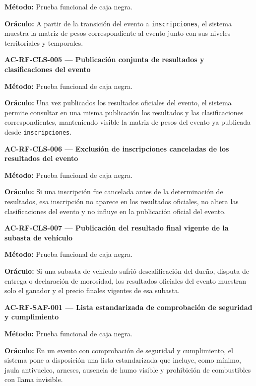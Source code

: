 \documentclass[10pt,letterpaper]{article}
\begin{document}
\textbf{Método:} Prueba funcional de caja negra.\par
\textbf{Oráculo:} A partir de la transición del evento a \texttt{inscripciones}, el sistema muestra la matriz de pesos correspondiente al evento junto con sus niveles territoriales y temporales.\par\vspace{0.45em}
\noindent\textbf{AC-RF-CLS-005 --- Publicación conjunta de resultados y clasificaciones del evento}\par
\textbf{Método:} Prueba funcional de caja negra.\par
\textbf{Oráculo:} Una vez publicados los resultados oficiales del evento, el sistema permite consultar en una misma publicación los resultados y las clasificaciones correspondientes, manteniendo visible la matriz de pesos del evento ya publicada desde \texttt{inscripciones}.\par\vspace{0.45em}
\noindent\textbf{AC-RF-CLS-006 --- Exclusión de inscripciones canceladas de los resultados del evento}\par
\textbf{Método:} Prueba funcional de caja negra.\par
\textbf{Oráculo:} Si una inscripción fue cancelada antes de la determinación de resultados, esa inscripción no aparece en los resultados oficiales, no altera las clasificaciones del evento y no influye en la publicación oficial del evento.\par\vspace{0.45em}
\noindent\textbf{AC-RF-CLS-007 --- Publicación del resultado final vigente de la subasta de vehículo}\par
\textbf{Método:} Prueba funcional de caja negra.\par
\textbf{Oráculo:} Si una subasta de vehículo sufrió descalificación del dueño, disputa de entrega o declaración de morosidad, los resultados oficiales del evento muestran solo el ganador y el precio finales vigentes de esa subasta.\par\vspace{0.45em}
\noindent\textbf{AC-RF-SAF-001 --- Lista estandarizada de comprobación de seguridad y cumplimiento}\par
\textbf{Método:} Prueba funcional de caja negra.\par
\textbf{Oráculo:} En un evento con comprobación de seguridad y cumplimiento, el sistema pone a disposición una lista estandarizada que incluye, como mínimo, jaula antivuelco, arneses, ausencia de humo visible y prohibición de combustibles con llama invisible.\par\vspace{0.45em}
\end{document}
